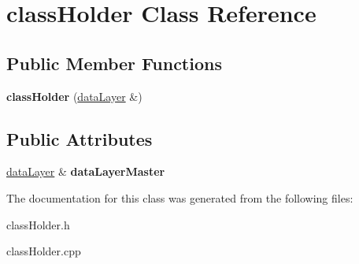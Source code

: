 \hypertarget{classclass_holder}{}\section{class\+Holder Class Reference}
\label{classclass_holder}
\subsection*{Public Member Functions}
\begin{DoxyCompactItemize}
\item 
\hypertarget{classclass_holder_a075d19fb95ec71d8907543494716585d}{}{\bfseries class\+Holder} (\hyperlink{classdata_layer}{data\+Layer} \&)\label{classclass_holder_a075d19fb95ec71d8907543494716585d}

\end{DoxyCompactItemize}
\subsection*{Public Attributes}
\begin{DoxyCompactItemize}
\item 
\hypertarget{classclass_holder_a7c2f9a9241b5421cd776321c7ce839fa}{}\hyperlink{classdata_layer}{data\+Layer} \& {\bfseries data\+Layer\+Master}\label{classclass_holder_a7c2f9a9241b5421cd776321c7ce839fa}

\end{DoxyCompactItemize}


The documentation for this class was generated from the following files\+:\begin{DoxyCompactItemize}
\item 
class\+Holder.\+h\item 
class\+Holder.\+cpp\end{DoxyCompactItemize}
